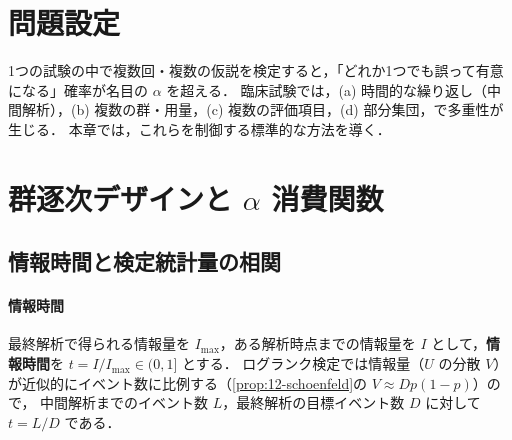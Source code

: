\documentclass[a4paper,11pt,openany]{ltjsbook}
\newcommand{\tagbox}[2]{\tcbox[on line,boxsep=0.5pt,left=2pt,right=2pt,top=0.5pt,bottom=0.5pt,
  colframe=#1,colback=#1!10,boxrule=0.4pt,arc=1pt]{\scriptsize\bfseries\textcolor{#1}{#2}}}
\newcommand{\Hinshutsu}{\tagbox{bkorange}{頻出}}
\newcommand{\emphx}[1]{\textbf{\textcolor{bkblue}{#1}}}
\begin{document}
\section{問題設定}\label{sec:14-setting}
1つの試験の中で複数回・複数の仮説を検定すると，「どれか1つでも誤って有意になる」確率が名目の $\alpha$ を超える．
臨床試験では，(a) 時間的な繰り返し（中間解析），(b) 複数の群・用量，(c) 複数の評価項目，(d) 部分集団，で多重性が生じる．
本章では，これらを制御する標準的な方法を導く．

\section{群逐次デザインと \texorpdfstring{$\alpha$}{α} 消費関数}\label{sec:14-gsd}
\Hinshutsu
\subsection{情報時間と検定統計量の相関}\label{subsec:14-info}
\paragraph{情報時間}
最終解析で得られる情報量を $I_{\max}$，ある解析時点までの情報量を $I$ として，\emphx{情報時間}を $t=I/I_{\max}\in(0,1]$ とする．
ログランク検定では情報量（$U$ の分散 $V$）が近似的にイベント数に比例する（\cref{prop:12-schoenfeld}の $V\approx Dp(1-p)$）ので，
中間解析までのイベント数 $L$，最終解析の目標イベント数 $D$ に対して $t=L/D$ である．
\end{document}
